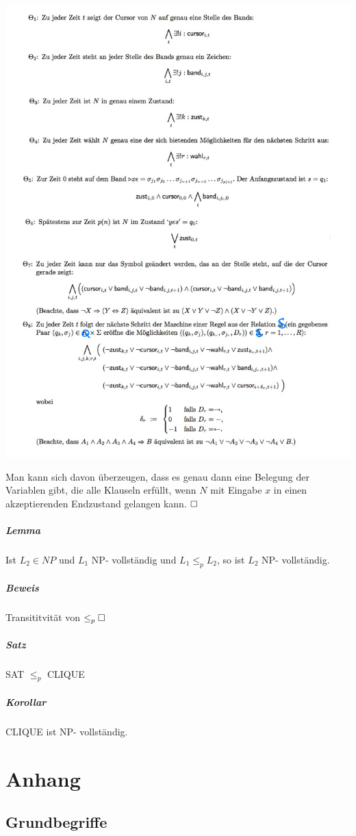 \documentclass[fleqn]{scrartcl}
\begin{document}
\includegraphics[width=\textwidth]{./SATSchreibweisen}

Man kann sich davon überzeugen, dass es genau dann eine Belegung der Variablen gibt, die alle Klauseln erfüllt, wenn $N$ mit Eingabe $x$ in einen akzeptierenden Endzustand gelangen kann. $\hfill \square$

\subparagraph{Lemma} Ist $L_2 \in NP$ und $L_1$ NP- vollständig und $L_1 \leq_p L_2$, so ist $L_2$ NP- vollständig.
\subparagraph{Beweis} Transititvität von $\leq_p \hfill \square$

\subparagraph{Satz} SAT $\leq_p$ CLIQUE
\subparagraph{Korollar} CLIQUE ist NP- vollständig.



\newpage
\section{Anhang}
\subsection{Grundbegriffe}
\end{document}
